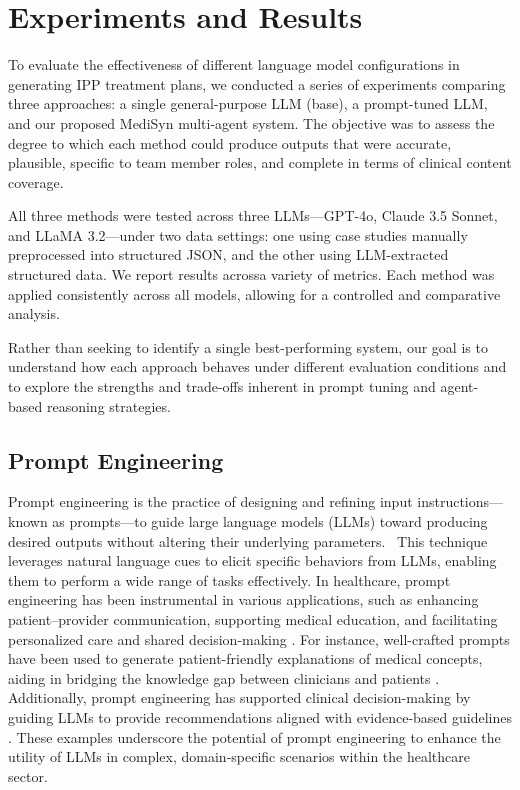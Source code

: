 \documentclass[pdflatex,sn-mathphys-num]{sn-jnl}%
\theoremstyle{thmstyleone}%
\theoremstyle{thmstyletwo}%
\theoremstyle{thmstylethree}%
\begin{document}
\section{Experiments and Results}\label{sec4}

To evaluate the effectiveness of different language model configurations in generating IPP treatment plans, we conducted a series of experiments comparing three approaches: a single general-purpose LLM (base), a prompt-tuned LLM, and our proposed MediSyn multi-agent system. The objective was to assess the degree to which each method could produce outputs that were accurate, plausible, specific to team member roles, and complete in terms of clinical content coverage.

All three methods were tested across three LLMs—GPT-4o, Claude 3.5 Sonnet, and LLaMA 3.2—under two data settings: one using case studies manually preprocessed into structured JSON, and the other using LLM-extracted structured data. We report results acrossa variety of metrics. Each method was applied consistently across all models, allowing for a controlled and comparative analysis.

Rather than seeking to identify a single best-performing system, our goal is to understand how each approach behaves under different evaluation conditions and to explore the strengths and trade-offs inherent in prompt tuning and agent-based reasoning strategies.

\subsection{Prompt Engineering}\label{subsec4.1}

Prompt engineering is the practice of designing and refining input instructions—known as prompts—to guide large language models (LLMs) toward producing desired outputs without altering their underlying parameters.~\cite{liu2023pre} This technique leverages natural language cues to elicit specific behaviors from LLMs, enabling them to perform a wide range of tasks effectively. In healthcare, prompt engineering has been instrumental in various applications, such as enhancing patient–provider communication, supporting medical education, and facilitating personalized care and shared decision-making \cite{prompt_engineering_healthcare}. For instance, well-crafted prompts have been used to generate patient-friendly explanations of medical concepts, aiding in bridging the knowledge gap between clinicians and patients \cite{prompt_engineering_patient_education}. Additionally, prompt engineering has supported clinical decision-making by guiding LLMs to provide recommendations aligned with evidence-based guidelines \cite{prompt_engineering_clinical_decision_support}. These examples underscore the potential of prompt engineering to enhance the utility of LLMs in complex, domain-specific scenarios within the healthcare sector.
\end{document}
